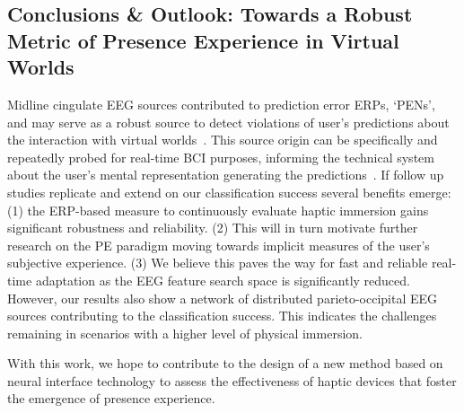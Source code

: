 \subsection{Conclusions \& Outlook: Towards a Robust Metric of Presence Experience in Virtual Worlds}

Midline cingulate EEG sources contributed to prediction error ERPs, `PENs', and may serve as a robust source to detect violations of user's predictions about the interaction with virtual worlds~\cite{Gehrke2019-og, Si-mohammed2020-ru, Zander2016-ed}. This source origin can be specifically and repeatedly probed for real-time BCI purposes, informing the technical system about the user's mental representation generating the predictions~\cite{Krol2020-lj, Zander2016-ed}. If follow up studies replicate and extend on our classification success several benefits emerge: (1) the ERP-based measure to continuously evaluate haptic immersion gains significant robustness and reliability. (2) This will in turn motivate further research on the PE paradigm moving towards implicit measures of the user's subjective experience. (3) We believe this paves the way for fast and reliable real-time adaptation as the EEG feature search space is significantly reduced. However, our results also show a network of distributed parieto-occipital EEG sources contributing to the classification success. This indicates the challenges remaining in scenarios with a higher level of physical immersion. 

With this work, we hope to contribute to the design of a new method based on neural interface technology to assess the effectiveness of haptic devices that foster the emergence of presence experience.




